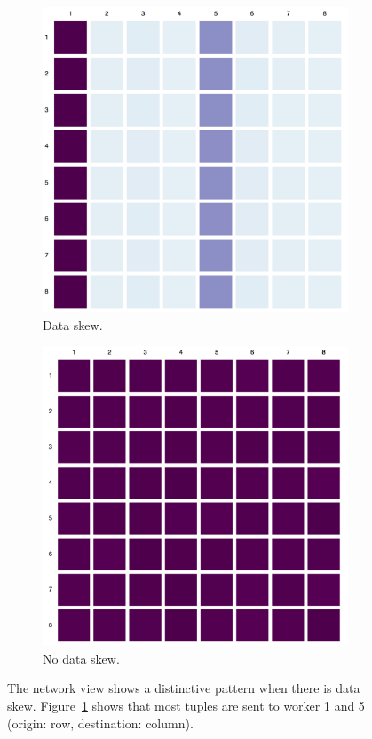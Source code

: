 \documentclass{chi2009}
\begin{document}
\begin{figure}[ht]
  \centering
  \begin{subfigure}[b]{0.49\columnwidth}
    \includegraphics[width=\columnwidth]{images/skew}
    \caption{Data skew.}
    \label{fig:skew}
  \end{subfigure}
  \begin{subfigure}[b]{0.49\columnwidth}
    \includegraphics[width=\columnwidth]{images/no-skew}
    \caption{No data skew.}
    \label{fig:no-skew}
  \end{subfigure}
  \caption{The network view shows a distinctive pattern when there is data skew. Figure~\ref{fig:skew} shows that most tuples are sent to worker 1 and 5 (origin: row, destination: column).}
  \label{fig:network}
\end{figure}
\end{document}
